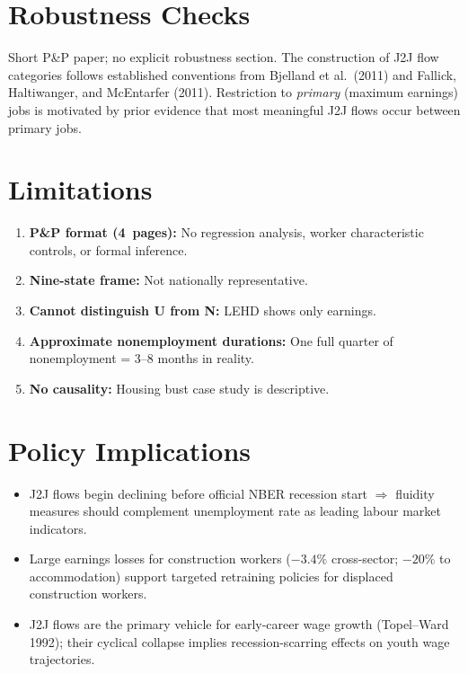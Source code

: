 \section{Robustness Checks}

Short P\&P paper; no explicit robustness section. The construction of J2J
flow categories follows established conventions from Bjelland et al.\ (2011)
and Fallick, Haltiwanger, and McEntarfer (2011). Restriction to
\emph{primary} (maximum earnings) jobs is motivated by prior evidence that
most meaningful J2J flows occur between primary jobs.

\section{Limitations}

\begin{enumerate}
  \item \textbf{P\&P format (4~pages):} No regression analysis, worker
    characteristic controls, or formal inference.
  \item \textbf{Nine-state frame:} Not nationally representative.
  \item \textbf{Cannot distinguish U from N:} LEHD shows only earnings.
  \item \textbf{Approximate nonemployment durations:} One full quarter
    of nonemployment = 3--8 months in reality.
  \item \textbf{No causality:} Housing bust case study is descriptive.
\end{enumerate}

\section{Policy Implications}

\begin{itemize}
  \item J2J flows begin declining before official NBER recession start
    $\Rightarrow$ fluidity measures should complement unemployment rate as
    leading labour market indicators.
  \item Large earnings losses for construction workers ($-3.4\%$ cross-sector;
    $-20\%$ to accommodation) support targeted retraining policies for
    displaced construction workers.
  \item J2J flows are the primary vehicle for early-career wage growth
    (Topel--Ward 1992); their cyclical collapse implies recession-scarring
    effects on youth wage trajectories.
\end{itemize}

